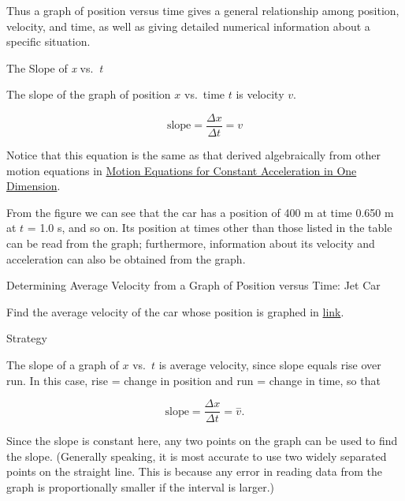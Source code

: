 \documentclass[
]{book}
\newenvironment{tinysection}{}{}
\newenvironment{note}{}{}
\begin{document}
Thus a graph of position versus time gives a general relationship among
position, velocity, and time, as well as giving detailed numerical
information about a specific situation.

\hypertarget{fs-id4125096}{}
\begin{note}

The Slope of \emph{x} vs.~\emph{t}

The slope of the graph of position \(x{}\) vs.~time
\(t{}\)\emph{} is velocity \(v{}\).

\leavevmode\hypertarget{import-auto-id4121188}{}%
\[\text{slope} = \frac{\Delta x}{\Delta t} = v\]

Notice that this equation is the same as that derived algebraically from
other motion equations in \href{/m54773}{Motion Equations for Constant Acceleration in
One Dimension}.

\end{note}

From the figure we can see that the car has a position of 400 m at time
0.650 m at \(t{}\) = 1.0 s, and so on. Its position at times other than
those listed in the table can be read from the graph; furthermore,
information about its velocity and acceleration can also be obtained
from the graph.

\hypertarget{fs-id1714610}{}
Determining Average Velocity from a Graph of Position versus Time: Jet
Car

Find the average velocity of the car whose position is graphed in
\protect\hyperlink{import-auto-id2574769}{link}.

\begin{tinysection}

{Strategy}

\end{tinysection}

The slope of a graph of \(x{}\) vs.~\(t{}\) is average velocity, since slope
equals rise over run. In this case, rise = change in position and run =
change in time, so that

\leavevmode\hypertarget{import-auto-id1850584}{}%
\[{\text{slope} = \frac{\Delta x}{\Delta t} = \overset{-}{v}}.\]

Since the slope is constant here, any two points on the graph can be
used to find the slope. (Generally speaking, it is most accurate to use
two widely separated points on the straight line. This is because any
error in reading data from the graph is proportionally smaller if the
interval is larger.)
\end{document}
